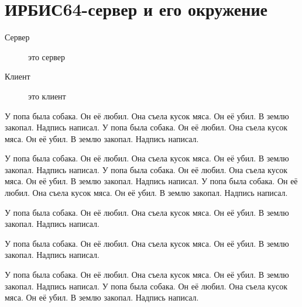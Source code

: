 \chapter{ИРБИС64-сервер и его окружение}

\begin{description}
	\item[Сервер] это сервер
	\item[Клиент] это клиент
\end{description}

У попа была собака. Он её любил. Она съела кусок мяса. Он её убил. В землю закопал. Надпись написал. У попа была собака. Он её любил. Она съела кусок мяса. Он её убил. В землю закопал. Надпись написал.

У попа была собака. Он её любил. Она съела кусок мяса. Он её убил. В землю закопал. Надпись написал. У попа была собака. Он её любил. Она съела кусок мяса. Он её убил. В землю закопал. Надпись написал. У попа была собака. Он её любил. Она съела кусок мяса. Он её убил. В землю закопал. Надпись написал.

У попа была собака. Он её любил. Она съела кусок мяса. Он её убил. В землю закопал. Надпись написал.

У попа была собака. Он её любил. Она съела кусок мяса. Он её убил. В землю закопал. Надпись написал.

У попа была собака. Он её любил. Она съела кусок мяса. Он её убил. В землю закопал. Надпись написал. У попа была собака. Он её любил. Она съела кусок мяса. Он её убил. В землю закопал. Надпись написал.